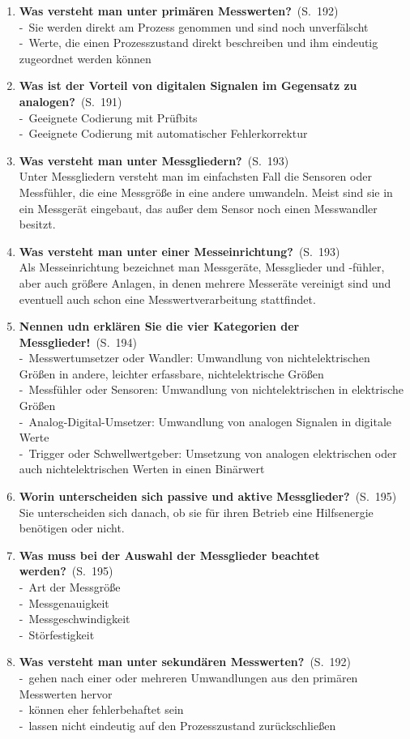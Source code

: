 \documentclass[a4paper,12pt]{article}
\newcommand{\question}[3]{\pagebreak[3]\item {\textbf{#1?}}\ (S.\ #2)#3}
\newcommand{\statement}[3]{\pagebreak[3]\item {\textbf{#1!}}\ (S.\ #2)#3}
\newcommand{\catchword}[1]{\\-\ #1}
\newcommand{\normaltext}[1]{\\#1}
\newcommand{\page}[1]{#1}
\begin{document}
\begin{enumerate}
   \question{Was versteht man unter primären Messwerten}{\page{192}}
  {
    \catchword{Sie werden direkt am Prozess genommen und sind noch unverfälscht}
    \catchword{Werte, die einen Prozesszustand direkt beschreiben und ihm eindeutig zugeordnet
    werden können}
  }

  \question{Was ist der Vorteil von digitalen Signalen im Gegensatz zu analogen}{\page{191}}
  {
    \catchword{Geeignete Codierung mit Prüfbits}
    \catchword{Geeignete Codierung mit automatischer Fehlerkorrektur}
  }

  \question{Was versteht man unter Messgliedern}{\page{193}}
  {
    \normaltext{Unter Messgliedern versteht man im einfachsten Fall die Sensoren oder Messfühler,
                die eine Messgröße in eine andere umwandeln. Meist sind sie in ein Messgerät
                eingebaut, das außer dem Sensor noch einen Messwandler besitzt.}
  }

  \question{Was versteht man unter einer Messeinrichtung}{\page{193}}
  {
    \normaltext{Als Messeinrichtung bezeichnet man Messgeräte, Messglieder und -fühler,
                aber auch größere Anlagen, in denen mehrere Messeräte vereinigt sind
                und eventuell auch schon eine Messwertverarbeitung stattfindet.}
  }

  \statement{Nennen udn erklären Sie die vier Kategorien der Messglieder}{\page{194}} 
  {
    \catchword{Messwertumsetzer oder Wandler: Umwandlung von nichtelektrischen Größen in andere,
               leichter erfassbare, nichtelektrische Größen}
    \catchword{Messfühler oder Sensoren: Umwandlung von nichtelektrischen in elektrische Größen}
    \catchword{Analog-Digital-Umsetzer: Umwandlung von analogen Signalen in digitale Werte}
    \catchword{Trigger oder Schwellwertgeber: Umsetzung von analogen elektrischen oder auch
               nichtelektrischen Werten in einen Binärwert}
  }

  \question{Worin unterscheiden sich passive und aktive Messglieder}{\page{195}}
  {
    \normaltext{Sie unterscheiden sich danach, ob sie für ihren Betrieb eine Hilfsenergie
                benötigen oder nicht.}
  }

  \question{Was muss bei der Auswahl der Messglieder beachtet werden}{\page{195}}
  {
    \catchword{Art der Messgröße}
    \catchword{Messgenauigkeit}
    \catchword{Messgeschwindigkeit}
    \catchword{Störfestigkeit}
  }

  \question{Was versteht man unter sekundären Messwerten}{\page{192}}
  {
    \catchword{gehen nach einer oder mehreren Umwandlungen aus den primären Messwerten hervor}
    \catchword{können eher fehlerbehaftet sein}
    \catchword{lassen nicht eindeutig auf den Prozesszustand zurückschließen}
  }
  

\end{enumerate}
\end{document}
